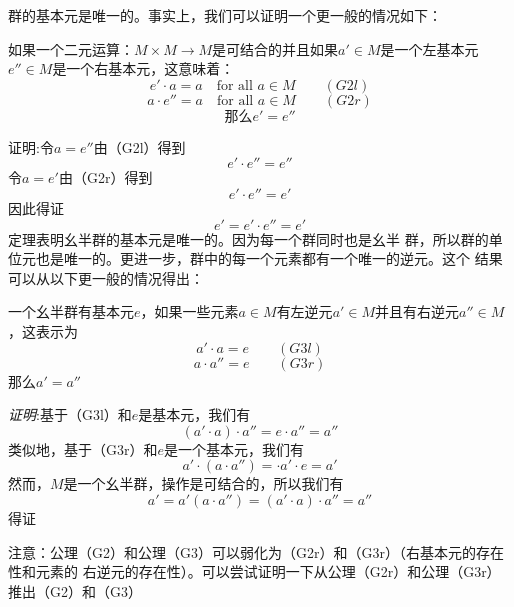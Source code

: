 群的基本元是唯一的。事实上，我们可以证明一个更一般的情况如下：
\begin{proposition} %
  如果一个二元运算：$M\times M\to M $是可结合的并且如果$a' \in M $是一个左基本元$e''
  \in M $是一个右基本元，这意味着：
\[
    e'\cdot a= a \quad \textrm{for all } a\in M \qquad (G2l)
\]
\[
    a\cdot e''= a \quad \textrm{for all } a\in M \qquad(G2r)
\]
\[
    那么 e'=e''
\]
\end{proposition}
证明:令$a = e''$由（G2l）得到
\[
  e'\cdot e''=e''
\]
令$a = e'$由（G2r）得到
\[
  e'\cdot e''=e'
\]
因此得证
\[
  e'=e'\cdot e''=e'
\]
定理表明幺半群的基本元是唯一的。因为每一个群同时也是幺半
群，所以群的单位元也是唯一的。更进一步，群中的每一个元素都有一个唯一的逆元。这个
结果可以从以下更一般的情况得出：
\begin{proposition}
  一个幺半群有基本元$e$，如果一些元素$a\in M$有左逆元$a' \in M$并且有右逆元$a'' \in
  M$，这表示为
\[
  a'\cdot a = e \qquad (G3l)
  \]
\[
  a\cdot a'' = e \qquad (G3r)
  \]
  那么$a'=a''$

  \emph{证明}:基于（G3l）和$e$是基本元，我们有
\[
(a'\cdot a)\cdot a'' = e\cdot a'' = a''
\]
类似地，基于（G3r）和$e$是一个基本元，我们有
\[
a'\cdot(a \cdot a'') = \cdot a'\cdot e = a'
\]
然而，$M$是一个幺半群，操作是可结合的，所以我们有
\[
a'=a'(a\cdot a'')= (a'\cdot a) \cdot a'' = a''
\]
得证

注意：公理（G2）和公理（G3）可以弱化为（G2r）和（G3r）（右基本元的存在性和元素的
右逆元的存在性）。可以尝试证明一下从公理（G2r）和公理（G3r）推出（G2）和（G3）
\end{proposition}


